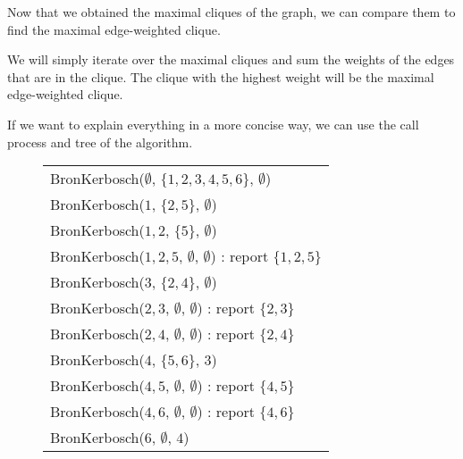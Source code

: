 Now that we obtained the maximal cliques of the graph, we can compare them to find
the maximal edge-weighted clique. \newline

We will simply iterate over the maximal cliques and sum the weights of the edges
that are in the clique. The clique with the highest weight will be the maximal
edge-weighted clique. \newline

\begin{minipage}{\linewidth}
    If we want to explain everything in a more concise way, we can use the call
    process and tree of the algorithm.
    \begin{figure}[H]
        \centering
        \begin{tabular}{|l|}
            \hline
            BronKerbosch($\emptyset$, $\{1,2,3,4,5,6\}$, $\emptyset$)                           \\
            \hspace{1em} BronKerbosch(${1}$, $\{2,5\}$, $\emptyset$)                            \\
            \hspace{2em} BronKerbosch(${1,2}$, $\{5\}$, $\emptyset$)                            \\
            \hspace{3em} BronKerbosch(${1,2,5}$, $\emptyset$, $\emptyset$) : report $\{1,2,5\}$ \\
            \hspace{1em} BronKerbosch(${3}$, $\{2,4\}$, $\emptyset$)                            \\
            \hspace{2em} BronKerbosch(${2,3}$, $\emptyset$, $\emptyset$) : report $\{2,3\}$     \\
            \hspace{2em} BronKerbosch(${2,4}$, $\emptyset$, $\emptyset$) : report $\{2,4\}$     \\
            \hspace{1em} BronKerbosch(${4}$, $\{5,6\}$, ${3}$)                                  \\
            \hspace{2em} BronKerbosch(${4,5}$, $\emptyset$, $\emptyset$) : report $\{4,5\}$     \\
            \hspace{2em} BronKerbosch(${4,6}$, $\emptyset$, $\emptyset$) : report $\{4,6\}$     \\
            \hspace{1em} BronKerbosch(${6}$, $\emptyset$, ${4}$)                                \\

\end{tabular}
\end{figure}
\end{minipage}
